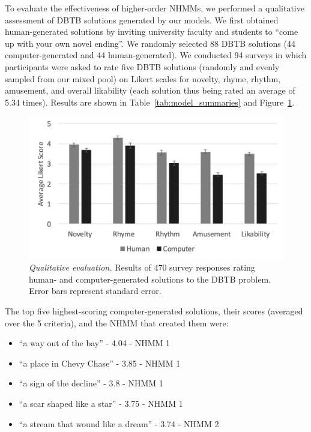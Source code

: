\documentclass[phd,electronic,oneside,twosidetoc,letterpaper,chaptercenter,parttop,lol,lof,lot]{byumsphd}
\begin{document}
To evaluate the effectiveness of higher-order NHMMs, we performed a qualitative assessment of DBTB solutions generated by our models. We first obtained human-generated solutions by inviting university faculty and students to ``come up with your own novel ending''. We randomly selected 88 DBTB solutions (44 computer-generated and 44 human-generated). We conducted 94 surveys in which participants were asked to rate five DBTB solutions (randomly and evenly sampled from our mixed pool) on Likert scales for novelty, rhyme, rhythm, amusement, and overall likability (each solution thus being rated an average of 5.34 times). Results are shown in Table~\ref{tab:model_summaries} and Figure~\ref{fig:results}.

\begin{figure} 
\centering
\includegraphics[width=\linewidth]{evaluative_results}
\caption{\textit{Qualitative evaluation.} Results of 470 survey responses rating human- and computer-generated solutions to the DBTB problem. Error bars represent standard error.}
\label{fig:results}
\end{figure}

The top five highest-scoring computer-generated solutions, their scores (averaged over the 5 criteria), and the NHMM that created them were:
\begin{itemize}
\item ``a way out of the bay'' - 4.04 - NHMM 1
\item ``a place in Chevy Chase'' - 3.85 - NHMM 1
\item ``a sign of the decline'' - 3.8 - NHMM 1
\item ``a scar shaped like a star'' - 3.75 - NHMM 1
\item ``a stream that wound like a dream'' - 3.74 - NHMM 2
\end{itemize}
\end{document}
